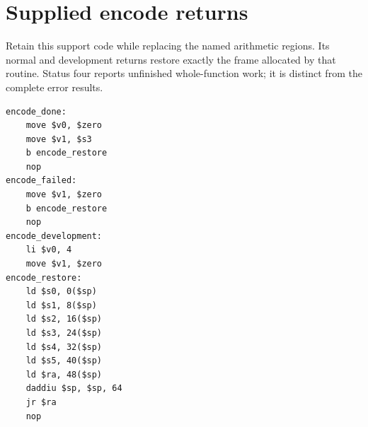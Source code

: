 \section{Supplied encode returns}
Retain this support code while replacing the named arithmetic regions. Its normal and development returns restore exactly the frame allocated by that routine. Status four reports unfinished whole-function work; it is distinct from the complete error results.

\begin{verbatim}
encode_done:
    move $v0, $zero
    move $v1, $s3
    b encode_restore
    nop
encode_failed:
    move $v1, $zero
    b encode_restore
    nop
encode_development:
    li $v0, 4
    move $v1, $zero
encode_restore:
    ld $s0, 0($sp)
    ld $s1, 8($sp)
    ld $s2, 16($sp)
    ld $s3, 24($sp)
    ld $s4, 32($sp)
    ld $s5, 40($sp)
    ld $ra, 48($sp)
    daddiu $sp, $sp, 64
    jr $ra
    nop
\end{verbatim}
